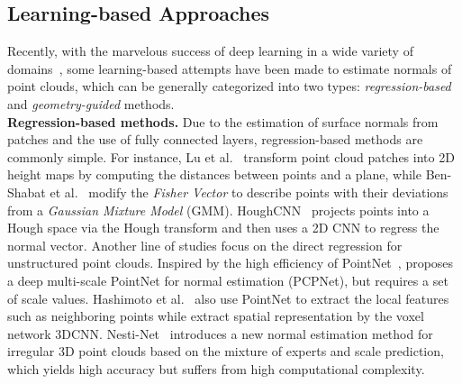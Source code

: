 \documentclass[runningheads]{llncs}
\begin{document}
\subsection{Learning-based Approaches}
Recently, with the marvelous success of deep learning in a wide variety of domains~\cite{qi2017pointnet,qi2017pointnet++,wang2019dynamic,rakotosaona2020pointcleannet,zhang2020pointfilter,hermosilla2019total,yu2018ec,pistilli2020learning,fan2021scf}, some learning-based attempts have been made to estimate normals of point clouds, which can be generally categorized into two types: \emph{regression-based}  and \emph{geometry-guided} methods.
\\
\textbf{Regression-based methods.} Due to the estimation of surface normals from patches and the use of fully connected layers, regression-based methods are commonly simple. For instance, Lu et al.~\cite{lu2020deep} transform point cloud patches into 2D height maps by computing the distances between points and a plane, while Ben-Shabat et al.~\cite{ben20183dmfv} modify the \emph{Fisher Vector} to describe points with their deviations from a \emph{Gaussian Mixture Model} (GMM). HoughCNN~\cite{boulch2016deep} projects points into a Hough space via the Hough transform and then uses a 2D CNN to regress the normal vector. Another line of studies focus on the direct regression for unstructured point clouds. Inspired by the high efficiency of PointNet~\cite{qi2017pointnet}, \cite{guerrero2018pcpnet} proposes a deep multi-scale PointNet for normal estimation (PCPNet), but requires a set of scale values. Hashimoto et al.~\cite{hashimoto2019normal} also use PointNet to extract the local features such as neighboring points while extract spatial representation by the voxel network 3DCNN. Nesti-Net~\cite{ben2019nesti} introduces a new normal estimation method for irregular 3D point clouds based on the mixture of experts and scale prediction, which yields high accuracy but suffers from high computational complexity.
\end{document}
